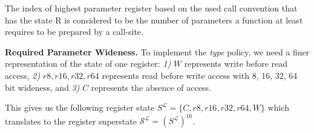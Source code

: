%
%
%

The index of highest parameter register based on the used call convention that has the state R is considered to be the number of parameters a function at least requires to be prepared by a call-site.

\textbf{Required Parameter Wideness.}
\label{subsection:requiredparamwideness}
To implement the \emph{type} policy, we need a finer representation of the state of one register:
\textit{1)} $W$ represents write before read access,
\textit{2)} $r8, r16, r32, r64$ represents read before write access with 8, 16, 32, 64 bit wideness, and
\textit{3)} $C$ represents the absence of access.

This gives us the following register state $S^\mathcal{L} = \{ C, r8, r16, r32, r64, W \}$ which translates to the register superstate 
$\mathcal{S}^\mathcal{L} = (S^\mathcal{L})^{16}$.

